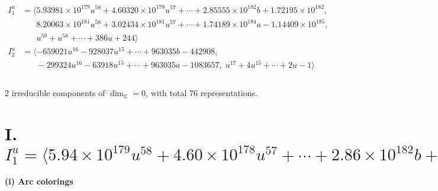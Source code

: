 \documentclass[1p]{elsarticle_modified}
\theoremstyle{definition}
\begin{document}
\begin{align*}
I^u_{1}&=\langle 
5.93981\times10^{179} u^{58}+4.60320\times10^{178} u^{57}+\cdots+2.85555\times10^{182} b+1.72195\times10^{182},\\
\phantom{I^u_{1}}&\phantom{= \langle  }8.20063\times10^{181} u^{58}+3.02434\times10^{181} u^{57}+\cdots+1.74189\times10^{184} a-1.14409\times10^{185},\\
\phantom{I^u_{1}}&\phantom{= \langle  }u^{59}+u^{58}+\cdots+386 u+244\rangle \\
I^u_{2}&=\langle 
-659021 u^{16}-928037 u^{15}+\cdots+963035 b-442908,\\
\phantom{I^u_{2}}&\phantom{= \langle  }-299324 u^{16}-63918 u^{15}+\cdots+963035 a-1083657,\;u^{17}+4 u^{15}+\cdots+2 u-1\rangle \\
\\
\end{align*}
\raggedright * 2 irreducible components of $\dim_{\mathbb{C}}=0$, with total 76 representations.\\
\newpage
\renewcommand{\arraystretch}{1}
\centering \section*{I. $I^u_{1}= \langle 5.94\times10^{179} u^{58}+4.60\times10^{178} u^{57}+\cdots+2.86\times10^{182} b+1.72\times10^{182},\;8.20\times10^{181} u^{58}+3.02\times10^{181} u^{57}+\cdots+1.74\times10^{184} a-1.14\times10^{185},\;u^{59}+u^{58}+\cdots+386 u+244 \rangle$}
\flushleft \textbf{(i) Arc colorings}\\
\end{document}
